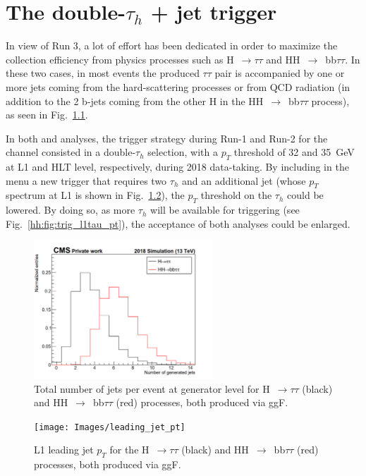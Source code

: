 \documentclass[../main.tex]{subfiles}
\begin{document}
\chapter{The double-$\tau_h$ + jet trigger}
\label{hh:chapter:trigger}

In view of Run 3, a lot of effort has been dedicated in order to maximize the collection efficiency from physics processes such as H~$\to\tau\tau$ and HH~$\to$~bb$\tau\tau$. In these two cases, in most events the produced $\tau\tau$ pair is accompanied by one or more jets coming from the hard-scattering processes or from QCD radiation (in addition to the 2 b-jets coming from the other H in the HH~$\to$~bb$\tau\tau$ process), as seen in Fig.~\ref{hh:fig:trig_ngenjets}.

In both \htt{} and \hhbbtt{} analyses, the trigger strategy during Run-1 and Run-2 for the \tauh\tauh{} channel consisted in a double-$\tau_h$ selection, with a $p_T$ threshold of 32 and 35~GeV at L1 and HLT level, respectively, during 2018 data-taking. By including in the menu a new trigger that requires two $\tau_h$ and an additional jet (whose $p_T$ spectrum at L1 is shown in Fig.~\ref{hh:fig:trig_l1jet_pt}), the $p_T$ threshold on the $\tau_h$ could be lowered. By doing so, as more $\tau_h$ will be available for triggering (see Fig.~\ref{hh:fig:trig_l1tau_pt}), the acceptance of both analyses could be enlarged.


\begin{figure}[h!]
\begin{center}
\includegraphics[width=0.6\textwidth]{Images/ngenjets}
\end{center}
\caption[Number of jets at generator level]{Total number of jets per event at generator level for H~$\to\tau\tau$ (black) and HH~$\to$~bb$\tau\tau$ (red) processes, both produced via ggF.}
\label{hh:fig:trig_ngenjets}
\end{figure}

\begin{figure}[h!]
\begin{center}
\texttt{[image: Images/leading\_jet\_pt]}
\end{center}
\caption[L1 leading jet $p_T$]{L1 leading jet $p_T$ for the H~$\to\tau\tau$ (black) and HH~$\to$~bb$\tau\tau$ (red) processes, both produced via ggF.}
\label{hh:fig:trig_l1jet_pt}
\end{figure}
\end{document}

